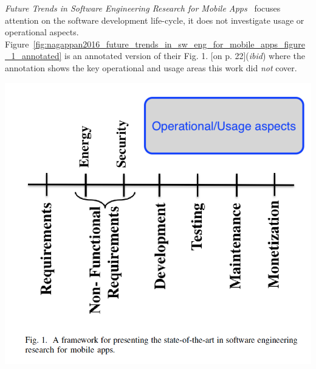 \emph{Future Trends in Software Engineering Research for Mobile Apps}~ focuses attention on the software development life-cycle, it does not investigate usage or operational aspects. Figure~\ref{fig:nagappan2016_future_trends_in_sw_eng_for_mobile_apps_figure_1_annotated} is an annotated version of their Fig. 1. [on p. 22](\textit{ibid}) where the annotation shows the key operational and usage areas this work did \emph{not} cover. 


    {\centering
    \includegraphics[width=\linewidth]{images/related-work/future-trends-in-sweng-for-mobile-apps-fig-1-annotated.png}
    \label{fig:nagappan2016_future_trends_in_sw_eng_for_mobile_apps_figure_1_annotated}
    } %

